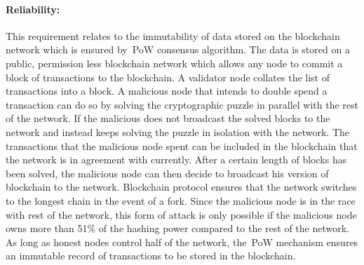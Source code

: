\paragraph{Reliability:}This requirement relates to the immutability of data
stored on the blockchain network which is ensured by~\ac{PoW} consensus
algorithm. The data is stored on a public, permission less blockchain network
which allows any node to commit a block of transactions to the blockchain. A
validator node collates the list of transactions into a block. A malicious node
that intends to double spend a transaction can do so by solving the
cryptographic puzzle in parallel with the rest of the network. If the malicious
does not broadcast the solved blocks to the network and instead keeps solving
the puzzle in isolation with the network. The transactions that the malicious
node spent can be included in the blockchain that the network is in agreement
with currently. After a certain length of blocks has been solved, the malicious
node can then decide to broadcast his version of blockchain to the network.
Blockchain protocol ensures that the network switches to the longest chain in
the event of a fork. Since the malicious node is in the race with rest of the
network, this form of attack is only possible if the malicious node owns more
than 51\% of the hashing power compared to the rest of the network. As long as
honest nodes control half of the network, the~\ac{PoW} mechanism ensures an
immutable record of transactions to be stored in the blockchain.

